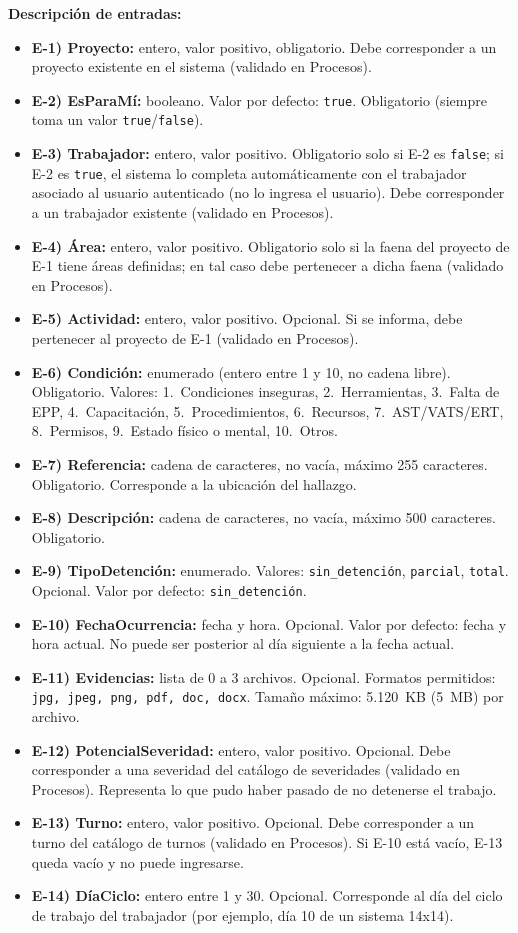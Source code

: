 \textbf{Descripci\'on de entradas:}
\begin{itemize}[label={}, leftmargin=1.5em]
  \item \textbf{E-1) Proyecto:} entero, valor positivo, obligatorio. Debe corresponder a un proyecto existente en el sistema (validado en Procesos).
  \item \textbf{E-2) EsParaM\'i:} booleano. Valor por defecto: \texttt{true}. Obligatorio (siempre toma un valor \texttt{true}/\texttt{false}).
  \item \textbf{E-3) Trabajador:} entero, valor positivo. Obligatorio solo si E-2 es \texttt{false}; si E-2 es \texttt{true}, el sistema lo completa autom\'aticamente con el trabajador asociado al usuario autenticado (no lo ingresa el usuario). Debe corresponder a un trabajador existente (validado en Procesos).
  \item \textbf{E-4) \'Area:} entero, valor positivo. Obligatorio solo si la faena del proyecto de E-1 tiene \'areas definidas; en tal caso debe pertenecer a dicha faena (validado en Procesos).
  \item \textbf{E-5) Actividad:} entero, valor positivo. Opcional. Si se informa, debe pertenecer al proyecto de E-1 (validado en Procesos).
  \item \textbf{E-6) Condici\'on:} enumerado (entero entre 1 y 10, no cadena libre). Obligatorio. Valores: 1.~Condiciones inseguras, 2.~Herramientas, 3.~Falta de EPP, 4.~Capacitaci\'on, 5.~Procedimientos, 6.~Recursos, 7.~AST/VATS/ERT, 8.~Permisos, 9.~Estado f\'isico o mental, 10.~Otros.
  \item \textbf{E-7) Referencia:} cadena de caracteres, no vac\'ia, m\'aximo 255 caracteres. Obligatorio. Corresponde a la ubicaci\'on del hallazgo.
  \item \textbf{E-8) Descripci\'on:} cadena de caracteres, no vac\'ia, m\'aximo 500 caracteres. Obligatorio.
  \item \textbf{E-9) TipoDetenci\'on:} enumerado. Valores: \texttt{sin\_detenci\'on}, \texttt{parcial}, \texttt{total}. Opcional. Valor por defecto: \texttt{sin\_detenci\'on}.
  \item \textbf{E-10) FechaOcurrencia:} fecha y hora. Opcional. Valor por defecto: fecha y hora actual. No puede ser posterior al d\'ia siguiente a la fecha actual.
  \item \textbf{E-11) Evidencias:} lista de 0 a 3 archivos. Opcional. Formatos permitidos: \texttt{jpg, jpeg, png, pdf, doc, docx}. Tama\~no m\'aximo: 5.120~KB (5~MB) por archivo.
  \item \textbf{E-12) PotencialSeveridad:} entero, valor positivo. Opcional. Debe corresponder a una severidad del cat\'alogo de severidades (validado en Procesos). Representa lo que pudo haber pasado de no detenerse el trabajo.
  \item \textbf{E-13) Turno:} entero, valor positivo. Opcional. Debe corresponder a un turno del cat\'alogo de turnos (validado en Procesos). Si E-10 est\'a vac\'io, E-13 queda vac\'io y no puede ingresarse.
  \item \textbf{E-14) D\'iaCiclo:} entero entre 1 y 30. Opcional. Corresponde al d\'ia del ciclo de trabajo del trabajador (por ejemplo, d\'ia 10 de un sistema 14x14).
\end{itemize}

